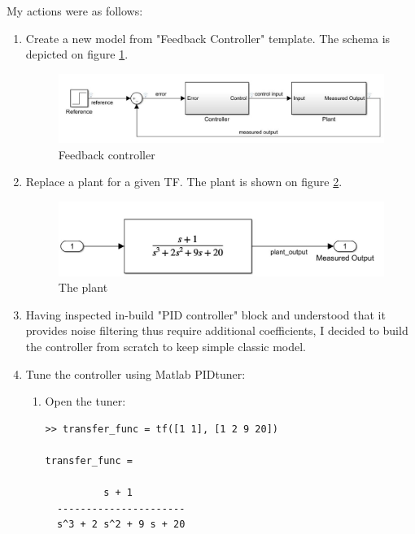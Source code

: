 \documentclass[12pt,letterpaper]{article}
\begin{document}
    My actions were as follows:
    \begin{enumerate}[leftmargin=!,labelindent=5pt]
        \item Create a new model from "Feedback Controller" template. The schema is depicted on figure \ref{fig:schema}.
        \begin{figure}[H]
            \centering
            \includegraphics[width=15cm]{images/schemas/overall.jpg}
            \caption{Feedback controller}
            \label{fig:schema}
        \end{figure}
        
        \item Replace a plant for a given TF. The plant is shown on figure \ref{fig:plant}.
        \begin{figure}[H]
            \centering
            \includegraphics[width=15cm]{images/schemas/plant.jpg}
            \caption{The plant}
            \label{fig:plant}
        \end{figure}  
        
        \item Having inspected in-build "PID controller" block and understood that it provides noise filtering thus require additional coefficients, I decided to build the controller from scratch to keep simple classic model.
        
        \item Tune the controller using Matlab PIDtuner:
        \begin{enumerate}
            \item Open the tuner:
            \begin{verbatim}
>> transfer_func = tf([1 1], [1 2 9 20])

transfer_func =
 
          s + 1
  ----------------------
  s^3 + 2 s^2 + 9 s + 20
 

\end{verbatim}
\end{enumerate}
\end{enumerate}
\end{document}
